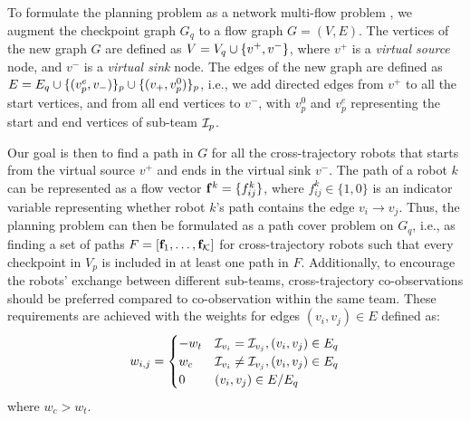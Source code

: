 \documentclass[journal]{IEEEtran}  %
\begin{document}
\begin{remark}
\end{remark}

To formulate the planning problem as a network multi-flow problem , we augment the checkpoint graph $G_{q}$ to a flow graph $G=(V, E)$. The vertices of the new graph $G$ are defined as $V= V_{q} \cup \{v^{+},v^{-}\}$, where $v^{+}$ is a \emph{virtual source} node, and $v^{-}$ is a \emph{virtual sink} node. The edges of the new graph are defined as $E = E_{q} \cup \{( v^{e}_{p},v_{-})\}_{p} \cup \{(v_{+},v^{0}_{p})\}_{p}$, i.e., we add directed edges from $v^{+}$ to all the start vertices, and from all end vertices to $v^{-}$, with $v^0_p$ and $v^e_p$ representing the start and end vertices of sub-team $\mathcal{I}_p$.

Our goal is then to find a path in $G$ for all the cross-trajectory robots that starts from the virtual source $v^{+}$ and ends in the virtual sink $v^{-}$.
The path of a robot $k$ can be represented as a flow vector $\mathbf{f}^{k} = \{ f^{k}_{ij} \}$, where $f^{k}_{ij} \in \{1,0\}$ is an indicator variable representing whether robot $k$'s path contains the edge $v_{i}\to v_{j}$. 
Thus, the planning problem can then be formulated as a path cover problem on $G_{q}$, i.e., as finding a set of paths $F=[\mathbf{f}_{1},\dots, \mathbf{f}_{\mathcal{K}}]$ for cross-trajectory robots such that every checkpoint in $V_{p}$ is included in at least one path in $F$. Additionally, to encourage the robots' exchange between different sub-teams, cross-trajectory co-observations should be preferred compared to co-observation within the same team. 
These requirements are achieved with the weights for edges $(v_{i},v_{j})\in E$ defined as:
\begin{equation}
	w_{i,j}=\begin{cases}
	-w_{t} & \mathcal{I}_{v_{i}}=\mathcal{I}_{v_{j}}, (v_{i},v_{j})\in E_{q}\\
	w_{c} & \mathcal{I}_{v_{i}} \neq \mathcal{I}_{v_{j}}, (v_{i},v_{j})\in E_{q}\\
	0 &  (v_{i},v_{j})\in E / E_{q} 
	\end{cases}
\end{equation}
where $w_{c} > w_{t}$. 
\end{document}
